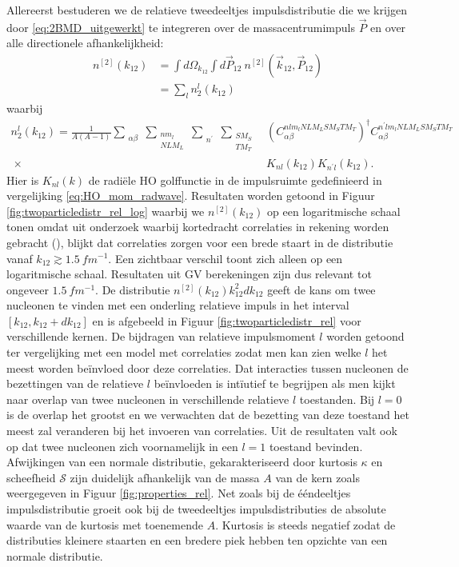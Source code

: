 \documentclass[11pt,twoside]{book}
\begin{document}
Allereerst bestuderen we de relatieve tweedeeltjes impulsdistributie die we krijgen door  \eqref{eq:2BMD_uitgewerkt} te integreren over de massacentrumimpuls $\vec{P}$ en over alle directionele afhankelijkheid:
\begin{align} \label{eq:rel_two}
n^{[2]}(k_{12}) & = \int d\Omega_{k_{12}}\int d\vec{P}_{12}\ n^{[2]}(\vec{k}_{12},\vec{P}_{12}) \nonumber \\
							& = \sum_{l} n_2^{l}(k_{12})
\end{align}
waarbij
\begin{align*}
n_2^{l}(k_{12}) = \frac{1}{A(A-1)} \sum_{\substack{\alpha \beta}} \sum_{\substack{nm_l \\ NLM_L}} \sum_{\substack{n^{\prime} }} \sum_{\substack{S M_S \\T M_T}} &  \left( C_{\alpha \beta}^{nlm_l NLM_L  S M_S T M_T} \right)^\dagger  C_{\alpha \beta}^{ n^{\prime} lm_l NLM_L  S M_S T M_T} \\ \ \times & K_{nl}(k_{12}) K_{n^{\prime} l}(k_{12}).
\end{align*}
Hier is $K_{nl}(k)$ de radi\"{e}le HO golffunctie in de impulsruimte gedefinieerd in vergelijking \eqref{eq:HO_mom_radwave}.
Resultaten worden getoond in Figuur \ref{fig:twoparticledistr_rel_log} waarbij we $n^{[2]}(k_{12})$ op een logaritmische schaal tonen omdat uit onderzoek waarbij kortedracht correlaties in rekening worden gebracht (\cite{maarten,wiringa2014nucleon}), blijkt dat correlaties zorgen voor een brede staart in de distributie vanaf $k_{12} \gtrsim 1.5\ fm^{-1}$. Een zichtbaar verschil toont zich alleen op een logaritmische schaal.  Resultaten uit GV berekeningen zijn dus relevant tot ongeveer $1.5\ fm^{-1}$. De distributie $n^{[2]}(k_{12})k_{12}^2dk_{12}$ geeft de kans om twee nucleonen te vinden met een onderling relatieve impuls in het interval $[ k_{12}, k_{12}+ d k_{12} ]$ en is afgebeeld in Figuur \ref{fig:twoparticledistr_rel} voor verschillende kernen. De bijdragen van relatieve impulsmoment $l$ worden getoond ter vergelijking met een model met correlaties zodat men kan zien welke $l$ het meest worden be\"{i}nvloed door deze correlaties. Dat interacties tussen nucleonen de bezettingen van de relatieve $l$ be\"{i}nvloeden is int\"{i}utief te begrijpen als men kijkt naar overlap van twee nucleonen in verschillende relatieve $l$ toestanden. Bij $l=0$ is de overlap het grootst en we verwachten dat de bezetting van deze toestand het meest zal veranderen bij het invoeren van correlaties. Uit de resultaten valt ook op dat twee nucleonen zich voornamelijk in een $l=1$ toestand bevinden. Afwijkingen van een normale distributie, gekarakteriseerd door kurtosis $\kappa$ en scheefheid $\mathcal{S}$ zijn duidelijk afhankelijk van de massa $A$ van de kern zoals weergegeven in Figuur \ref{fig:properties_rel}. Net zoals bij de \'{e}\'{e}ndeeltjes impulsdistributie groeit ook bij de tweedeeltjes impulsdistributies de absolute waarde van de kurtosis met toenemende $A$. Kurtosis is steeds negatief zodat de distributies kleinere staarten en een bredere piek hebben ten opzichte van een normale distributie. 
\end{document}
